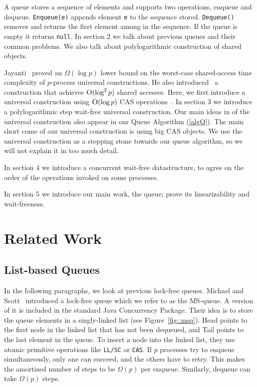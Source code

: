\documentclass[10pt]{article}
\theoremstyle{definition}
\begin{document}
A queue stores a sequence of elements and supports two operations, enqueue and dequeue. \texttt{Enqueue(e)} appends element \texttt{e} to the sequence stored. \texttt{Dequeue()} removes and returns the first element among in the sequence. If the queue is empty it returns \texttt{null}. In section 2 we talk about previous queues and their common problems. We also talk about polylogarithmic construction of shared objects.

Jayanti~\cite{DBLP:conf/podc/Jayanti98a} proved an $\Omega(\log p)$ lower bound on the worst-case shared-access time complexity of $p$-process universal constructions. He also introduced~\cite{DBLP:conf/podc/ChandraJT98} a construction that achieves $\textsc{O}(\log^2 p)$ shared accesses. Here, we first introduce a universal construction using $\textsc{O}(\log p)$ CAS operations~\cite{DBLP:conf/fsttcs/JayantiP05}. In section 3 we introduce a polylogarithmic step wait-free universal construction. Our main ideas in of the universal construction also appear in our Queue Algorithm (\ref{algQ}). The main short come of our universal construction is using big CAS objects. We use the universal construction as a stepping stone towards our queue algorithm, so we will not explain it in too much detail.

In section 4 we introduce a concurrent wait-free datastructure, to agree on the order of the operations invoked on some processes.

In section 5 we introduce our main work, the queue; prove its linearizability and wait-freeness.

\pagebreak
\section{Related Work}
\subsection{List-based Queues}
In the following paragraphs, we look at previous lock-free queues.
Michael and Scott~\cite{DBLP:conf/podc/MichaelS96} introduced a lock-free queue which we refer to as the MS-queue. A version of it is included in the standard Java Concurrency Package. Their idea is to store the queue elements in a singly-linked list (see Figure~\ref{fig::msq}). Head points to the first node in the linked list that has not been dequeued, and Tail points to the last element in the queue. To insert a node into the linked list, they use atomic primitive operations like \texttt{LL/SC} or \texttt{CAS}. If $p$ processes try to enqueue simultaneously, only one can succeed, and the others have to retry. This makes the amortized number of steps to be $\Omega(p)$ per enqueue. Similarly, dequeue can take $\Omega(p)$ steps.
\end{document}

